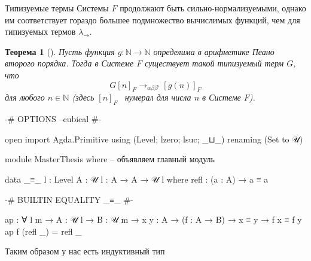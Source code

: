\documentclass{article}[12pt]
\newtheorem{theorem}{Теорема}
\newcommand{\dash}{\textemdash\ }
\begin{document}
\begin{multicols}{2}
    \begin{prooftree}
    \end{prooftree}
    \begin{prooftree}
    \end{prooftree}
\end{multicols}
\begin{prooftree}
\end{prooftree}

Типизуемые термы Системы $F$ продолжают быть сильно-нормализуемыми\cite{SorUrz06}, однако им 
соответствует гораздо большее подмножество вычислимых функций, чем для типизуемых термов $\lambda_\rightarrow$.

\begin{theorem}[\cite{Gira71}]
    Пусть функция $g : \mathbb N \rightarrow \mathbb N$ определима в арифметике Пеано второго порядка.
    Тогда в Системе $F$ существует такой типизуемый терм $G$, что
    $$G[n]_F \rightarrow_{\alpha \beta \beta'} [g(n)]_F$$
    для любого $n \in \mathbb N$ (здесь $[n]_F$ \dash нумерал для числа $n$ в Системе $F$).
\end{theorem}

\begin{code}

{-# OPTIONS --cubical #-}

open import Agda.Primitive using (Level; lzero; lsuc; _⊔_)
                           renaming (Set to 𝒰)

module MasterThesis where -- объявляем главный модуль

data _≡_ {l : Level} {A : 𝒰 l} : A → A → 𝒰 l where
    refl : (a : A) → a ≡ a

{-# BUILTIN EQUALITY _≡_  #-}

ap : ∀ {l m} → {A : 𝒰 l} → {B : 𝒰 m} → {x y : A} 
     → (f : A → B) → x ≡ y → f x ≡ f y
ap f (refl _) = refl _

\end{code}

Таким образом у нас есть индуктивный тип 
\end{document}

